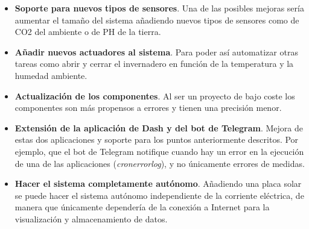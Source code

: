 \documentclass[a4paper, 12pt, oneside]{book}
\begin{document}
\begin{itemize}
\item \textbf{Soporte para nuevos tipos de sensores}. Una de las posibles mejoras sería aumentar el tamaño del sistema añadiendo nuevos tipos de sensores como de CO2 del ambiente o de PH de la tierra.

\item \textbf{Añadir nuevos actuadores al sistema}. Para poder así automatizar otras tareas como abrir y cerrar el invernadero en función de la temperatura y la humedad ambiente.

\item \textbf{Actualización de los componentes}. Al ser un proyecto de bajo coste los componentes son más propensos a errores y tienen una precisión menor.

\item \textbf{Extensión de la aplicación de Dash y del bot de Telegram}. Mejora de estas dos aplicaciones y soporte para los puntos anteriormente descritos. Por ejemplo, que el bot de Telegram notifique cuando hay un error en la ejecución de una de las aplicaciones (\textit{cronerrorlog}), y no únicamente errores de medidas.

\item \textbf{Hacer el sistema completamente autónomo}. Añadiendo una placa solar se puede hacer el sistema autónomo independiente de la corriente eléctrica, de manera que únicamente dependería de la conexión a Internet para la visualización y almacenamiento de datos. 
\end{itemize}


\cleardoublepage
\end{document}
